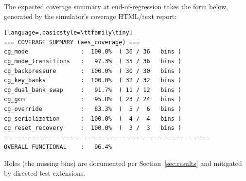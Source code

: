 \documentclass[conference,10pt,a4paper]{IEEEtran}
\begin{document}
The expected coverage summary at end-of-regression takes the form
below, generated by the simulator's coverage HTML/text report:

\begin{lstlisting}[language=,basicstyle=\ttfamily\tiny]
=== COVERAGE SUMMARY (aes_coverage) ===
cg_mode               :  100.0%  ( 36 / 36   bins )
cg_mode_transitions   :   97.3%  ( 35 / 36   bins )
cg_backpressure       :  100.0%  ( 30 / 30   bins )
cg_key_banks          :  100.0%  ( 32 / 32   bins )
cg_dual_bank_swap     :   91.7%  ( 11 / 12   bins )
cg_gcm                :   95.8%  ( 23 / 24   bins )
cg_override           :   83.3%  (  5 /  6   bins )
cg_serialization      :  100.0%  (  4 /  4   bins )
cg_reset_recovery     :  100.0%  (  3 /  3   bins )
-----------------------------------------------------------
OVERALL FUNCTIONAL    :   96.4%
\end{lstlisting}

Holes (the missing bins) are documented per Section~\ref{sec:results}
and mitigated by directed-test extensions.
\end{document}
